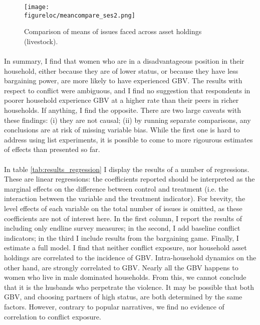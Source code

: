 \documentclass[11pt,a4paper]{scrartcl} %
\newcommand{\figureloc}{C:/Users/Koen/Dropbox/PhD/Papers/CongoGBV/Figures}
\begin{document}
\begin{figure}
\texttt{[image: \\figureloc/meancompare\_ses2.png]}
  \caption{Comparison of means of issues faced across asset holdings (livestock).}
  \label{fig:meancompare_ses2}
\end{figure}

\paragraph{}
In summary, I find that women who are in a disadvantageous position in their household, either because they are of lower status, or because they have less bargaining power, are more likely to have experienced GBV. The results with respect to conflict were ambiguous, and I find no suggestion that respondents in poorer household experience GBV at a higher rate than their peers in richer households. If anything, I find the opposite. There are two large caveats with these findings: (i) they are not causal; (ii) by running separate comparisons, any conclusions are at risk of missing variable bias. While the first one is hard to address using list experiments, it is possible to come to more rigourous estimates of effects than presented so far. 

\paragraph{}
In table \ref{tab:results_regression} I display the results of a number of regressions. These are linear regressions: the coefficients reported should be interpreted as the marginal effects on the difference between control and treatment (i.e. the interaction between the variable and the treatment indicator). For brevity, the level effects of each variable on the total number of issues is omitted, as these coefficients are not of interest here. In the first column, I report the results of including only endline survey measures; in the second, I add baseline conflict indicators; in the third I include results from the bargaining game. Finally, I estimate a full model. I find that neither conflict exposure, nor household asset holdings are correlated to the incidence of GBV. Intra-household dynamics on the other hand, are strongly correlated to GBV. Nearly all the GBV happens to women who live in male dominated households. From this, we cannot conclude that it is the husbands who perpetrate the violence. It may be possible that both GBV, and choosing partners of high status, are both determined by the same factors. However, contrary to popular narratives, we find no evidence of correlation to conflict exposure.
\end{document}
